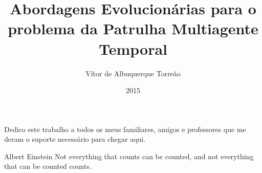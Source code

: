 \documentclass[pt,twoside,onehalfspacing,bsc]{risethesis}
\title{Abordagens Evolucionárias para o problema da Patrulha Multiagente Temporal}
\date{2015}
\author{Vítor de Albuquerque Torreão}
\begin{document}
\frontmatter

\frontpage

\presentationpage

\begin{fichacatalografica}
	\FakeFichaCatalografica %
\end{fichacatalografica}

\banca

\begin{dedicatory}
	Dedico este trabalho a todos os meus familiares, amigos e professores que
	me deram o suporte necessário para chegar aqui.
\end{dedicatory}

\acknowledgements


\begin{epigraph}[]{Albert Einstein}
Not everything that counts can be counted, and not everything that can be counted counts.
\end{epigraph}

\resumo


\abstract


\listoffigures

\listoftables

\listofalgorithms

\listofacronyms


\tableofcontents

\mainmatter







\begin{references}
  
\end{references}


\theappendix

\end{document}

